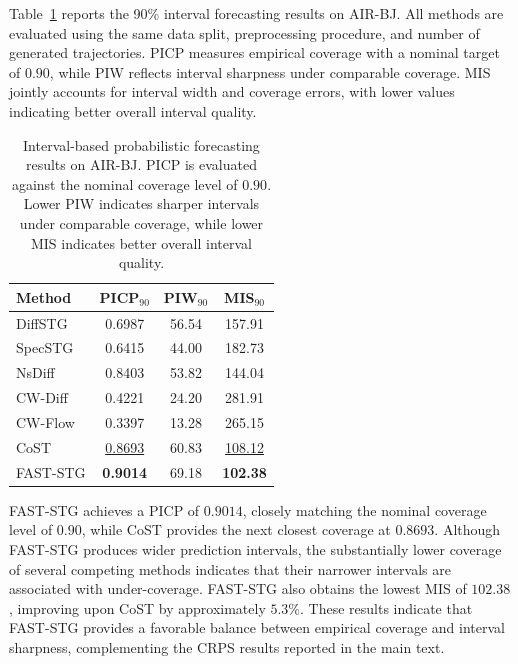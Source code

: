 \documentclass[sigconf, anonymous, review]{acmart}
\begin{document}
Table~\ref{tab:interval_results} reports the 90\% interval forecasting
results on AIR-BJ. All methods are evaluated using the same data split,
preprocessing procedure, and number of generated trajectories. PICP
measures empirical coverage with a nominal target of $0.90$, while PIW
reflects interval sharpness under comparable coverage. MIS jointly
accounts for interval width and coverage errors, with lower values
indicating better overall interval quality.

\begin{table}[h]
\centering
\caption{
Interval-based probabilistic forecasting results on AIR-BJ.
PICP is evaluated against the nominal coverage level of $0.90$.
Lower PIW indicates sharper intervals under comparable coverage,
while lower MIS indicates better overall interval quality.
}
\label{tab:interval_results}
\setlength{\tabcolsep}{6pt}
\renewcommand{\arraystretch}{1.08}
\begin{tabular}{lccc}
\toprule
Method & PICP$_{90}$ & PIW$_{90}$ & MIS$_{90}$ \\
\midrule
DiffSTG  & 0.6987 & 56.54 & 157.91 \\
SpecSTG  & 0.6415 & 44.00 & 182.73 \\
NsDiff   & 0.8403 & 53.82 & 144.04 \\
CW-Diff  & 0.4221 & 24.20 & 281.91 \\
CW-Flow  & 0.3397 & 13.28 & 265.15 \\
CoST     & \underline{0.8693} & 60.83 & \underline{108.12} \\
\midrule
FAST-STG & \textbf{0.9014} & 69.18 & \textbf{102.38} \\
\bottomrule
\end{tabular}
\end{table}

FAST-STG achieves a PICP of $0.9014$, closely matching the nominal
coverage level of $0.90$, while CoST provides the next closest
coverage at $0.8693$. Although FAST-STG produces wider prediction
intervals, the substantially lower coverage of several competing
methods indicates that their narrower intervals are associated with
under-coverage. FAST-STG also obtains the lowest MIS of $102.38$,
improving upon CoST by approximately $5.3\%$. These results indicate
that FAST-STG provides a favorable balance between empirical coverage
and interval sharpness, complementing the CRPS results reported in the
main text.
\end{document}
